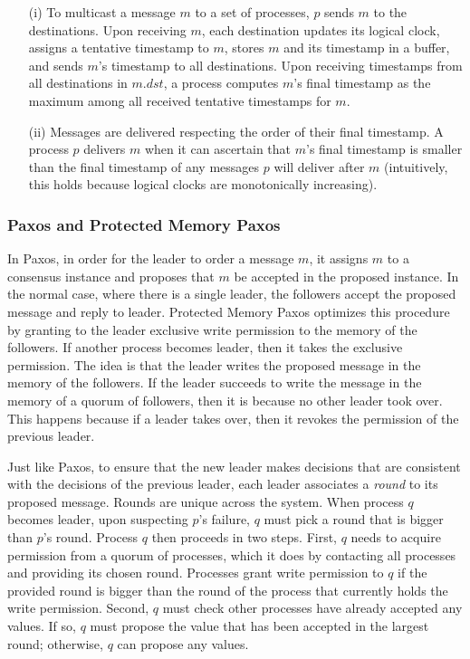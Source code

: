 \begin{itemize}
\item[(i)] To multicast a message $m$ to a set of processes, $p$ sends $m$ to the destinations.
Upon receiving $m$, each destination updates its logical clock, assigns a tentative timestamp to $m$, stores $m$ and its timestamp in a buffer, and sends $m$'s timestamp to all destinations.
Upon receiving timestamps from all destinations in $m.dst$, a process computes $m$'s final timestamp as the maximum among all received tentative timestamps for $m$.
\item[(ii)]Messages are delivered respecting the order of their final timestamp.
A process $p$ delivers $m$ when it can ascertain that $m$'s final timestamp is smaller than the final timestamp of any messages $p$ will deliver after $m$ (intuitively, this holds because logical clocks are monotonically increasing).
\end{itemize}

\subsubsection{Paxos and Protected Memory Paxos}

In Paxos, in order for the leader to order a message $m$, it assigns $m$ to a consensus instance and proposes that $m$ be accepted in the proposed instance.
In the normal case, where there is a single leader, the followers accept the proposed message and reply to leader.
Protected Memory Paxos optimizes this procedure by granting to the leader exclusive write permission to the memory of the followers.
If another process becomes leader, then it takes the exclusive permission.
The idea is that the leader writes the proposed message in the memory of the followers.
If the leader succeeds to write the message in the memory of a quorum of followers, then it is because no other leader took over.
This happens because if a leader takes over, then it revokes the permission of the previous leader.

Just like Paxos, to ensure that the new leader makes decisions that are consistent with the decisions of the previous leader, each leader associates a \emph{round} to its proposed message.
Rounds are unique across the system.
When process $q$ becomes leader, upon suspecting $p$'s failure, $q$ must pick a round that is bigger than $p$'s round.
Process $q$ then proceeds in two steps.
First, $q$ needs to acquire permission from a quorum of processes, which it does by contacting all processes and providing its chosen round.
Processes grant write permission to $q$ if the provided round is bigger than the round of the process that currently holds the write permission.
Second, $q$ must check other processes have already accepted any values.
If so, $q$ must propose the value that has been accepted in the largest round; otherwise, $q$ can propose any values.

